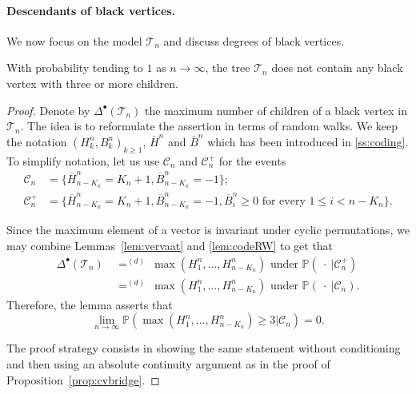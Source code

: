 \documentclass[AHL,XML,longabstracts,Unicode]{cedram}
\def\oB{\overline{B}}
\def\oH{\overline{H}}
\def\Ts{\mathscr{T}}
\renewcommand\Pr[1]{\mathbb{P}\left(#1\right)}
\begin{document}
\paragraph*{Descendants of black vertices.}
We now focus on the model $\Ts_n$ and discuss degrees of black vertices.


\begin{lemma}
  With probability tending to $1$ as $n \rightarrow \infty$, the tree $\Ts_{n}$ does not contain any black vertex with three or more children.
  \label{lem:AtMost2}
\end{lemma}

\begin{proof}
Denote by $\Delta^{\bullet}(\Ts_{n})$ the maximum number of children of a black vertex in $\Ts_{n}$.
The idea is to reformulate the assertion in terms of random walks.
We keep the notation  $(H^{n}_k,B^n_k)_{k \geq 1}$, $\overline{H}^{n}$ and $\overline{B}^{n}$ which has been introduced in \cref{ss:coding}.
To simplify notation, let us use $ \mathcal{C}_n$ and  $ \mathcal{C}^+_{n}$ for the events
\begin{align*}
  \mathcal{C}_{n}&= \{\oH^{n}_{n-K_{n}}=K_{n}+1,\oB^{n}_{n-K_{n}}=-1\};  \\
  \mathcal{C}^+_{n}&= \{\oH^{n}_{n-K_{n}}=K_{n}+1,\oB^{n}_{n-K_{n}}=-1, \oB^{n}_{i} \geq 0 \textrm{ for every } 1 \leq i <n-K_{n}\}.
\end{align*}

Since the maximum element of a vector is invariant under cyclic permutations, we may combine  Lemmas~\ref{lem:vervaat} and \ref{lem:codeRW} to get that
\begin{align*}
  \Delta^{\bullet}(\Ts_{n}) \ & \mathop{=}^{(d)} \  \max(H^{n}_{1}, \ldots, H^{n}_{n-K_{n}}) \textrm{ under } \Pr{\ \cdot  \ \big|  \mathcal{C}^+_{n} } \\
  & \mathop{=}^{(d)} \  \max(H^{n}_{1}, \ldots, H^{n}_{n-K_{n}}) \textrm{ under } \Pr{\ \cdot  \ \big|  \mathcal{C}_{n} }.
\end{align*}
Therefore, the lemma asserts that
\[\lim_{n \to \infty} \Pr{\max(H^{n}_{1}, \ldots, H^{n}_{n-K_{n}}) \geq 3 \big|  \mathcal{C}_{n} } = 0.\]

The proof strategy consists in showing the same statement without conditioning
and then using an absolute continuity argument as in the proof of Proposition~\ref{prop:cvbridge}.


\end{proof}
\end{document}
